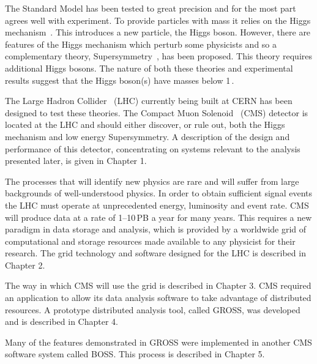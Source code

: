 %
%

The Standard Model has been tested to great precision and for the most part agrees well with experiment. To provide particles with mass it relies on the Higgs mechanism~\cite{citeulike:918519}. This introduces a new particle, the Higgs boson. However, there are features of the Higgs mechanism which perturb some physicists and so a complementary theory, Supersymmetry~\cite{citeulike:681336}, has been proposed. This theory requires additional Higgs bosons. The nature of both these theories and experimental results suggest that the Higgs boson(s) have masses below 1\,\TeVcc.

The Large Hadron Collider~\cite{LHC_CONCEPT} (LHC) currently being built at CERN has been designed to test these theories. The Compact Muon Solenoid~\cite{CMS_LOI,CMS_TP} (CMS) detector is located at the LHC and should either discover, or rule out, both the Higgs mechanism and low energy Supersymmetry. A description of the design and performance of this detector, concentrating on systems relevant to the analysis presented later, is given in Chapter 1.

The processes that will identify new physics are rare and will suffer from large backgrounds of well-understood physics. In order to obtain sufficient signal events the LHC must operate at unprecedented energy, luminosity and event rate. CMS will produce data at a rate of 1--10\,PB a year for many years. This requires a new paradigm in data storage and analysis, which is provided by a worldwide grid of computational and storage resources made available to any physicist for their research. The grid technology and software designed for the LHC is described in Chapter 2.

The way in which CMS will use the grid is described in Chapter 3. CMS required an application to allow its data analysis software to take advantage of distributed resources. A prototype distributed analysis tool, called GROSS, was developed and is described in Chapter 4. 

Many of the features demonstrated in GROSS were implemented in another CMS software system called BOSS. This process is described in Chapter 5. 

